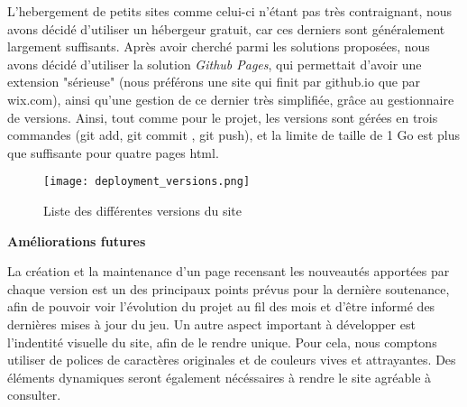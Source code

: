     L'hebergement de petits sites comme celui-ci n'étant pas très contraignant,
    nous avons décidé d'utiliser un hébergeur gratuit, car ces derniers
    sont généralement largement suffisants. Après avoir cherché parmi les
    solutions proposées, nous avons décidé d'utiliser la solution 
    \textit{Github Pages}, qui permettait d'avoir une extension "sérieuse"
    (nous préférons une site qui finit par github.io que par wix.com),
    ainsi qu'une gestion de ce dernier très simplifiée, grâce au gestionnaire de versions.
    Ainsi, tout comme pour le projet, les versions sont gérées en trois commandes 
    (git add, git commit , git push), et la limite de taille de 1 Go est plus que suffisante pour quatre pages html. 


    \begin{figure}[hbt!]
        \centering
        \texttt{[image: deployment\_versions.png]}
        \caption{Liste des différentes versions du site}
    \end{figure}

    
    \textbf{Améliorations futures}

    La création et la maintenance d'un page recensant les nouveautés apportées par chaque version est un des 
    principaux points prévus pour la dernière soutenance, afin de pouvoir voir l'évolution du projet au fil des 
    mois et d'être informé des dernières mises à jour du jeu. Un autre aspect important à développer est l'indentité
    visuelle du site, afin de le rendre unique. Pour cela,  nous comptons utiliser de polices de caractères originales 
    et de couleurs vives et attrayantes. Des éléments dynamiques seront également nécéssaires à rendre le site agréable 
    à consulter.